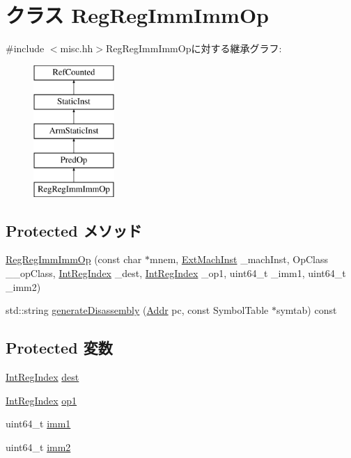 \hypertarget{classRegRegImmImmOp}{
\section{クラス RegRegImmImmOp}
\label{classRegRegImmImmOp}
}


{\ttfamily \#include $<$misc.hh$>$}RegRegImmImmOpに対する継承グラフ:\begin{figure}[H]
\begin{center}
\leavevmode
\includegraphics[height=5cm]{classRegRegImmImmOp}
\end{center}
\end{figure}
\subsection*{Protected メソッド}
\begin{DoxyCompactItemize}
\item 
\hyperlink{classRegRegImmImmOp_ae4d369ca0d5dddcf8607fdb94fc6e89c}{RegRegImmImmOp} (const char $\ast$mnem, \hyperlink{classStaticInst_a5605d4fc727eae9e595325c90c0ec108}{ExtMachInst} \_\-machInst, OpClass \_\-\_\-opClass, \hyperlink{namespaceArmISA_ae64680ba9fb526106829d6bf92fc791b}{IntRegIndex} \_\-dest, \hyperlink{namespaceArmISA_ae64680ba9fb526106829d6bf92fc791b}{IntRegIndex} \_\-op1, uint64\_\-t \_\-imm1, uint64\_\-t \_\-imm2)
\item 
std::string \hyperlink{classRegRegImmImmOp_a95d323a22a5f07e14d6b4c9385a91896}{generateDisassembly} (\hyperlink{classm5_1_1params_1_1Addr}{Addr} pc, const SymbolTable $\ast$symtab) const 
\end{DoxyCompactItemize}
\subsection*{Protected 変数}
\begin{DoxyCompactItemize}
\item 
\hyperlink{namespaceArmISA_ae64680ba9fb526106829d6bf92fc791b}{IntRegIndex} \hyperlink{classRegRegImmImmOp_aec72e8e45bdc87abeeeb75d2a8a9a716}{dest}
\item 
\hyperlink{namespaceArmISA_ae64680ba9fb526106829d6bf92fc791b}{IntRegIndex} \hyperlink{classRegRegImmImmOp_a4c465c43ad568f8bcf8ae71480e9cfea}{op1}
\item 
uint64\_\-t \hyperlink{classRegRegImmImmOp_a846a1153344f66cc5d7c5af6fc071bb4}{imm1}
\item 
uint64\_\-t \hyperlink{classRegRegImmImmOp_a4b3bca3d7461f9d143e9bcd456390a27}{imm2}
\end{DoxyCompactItemize}


